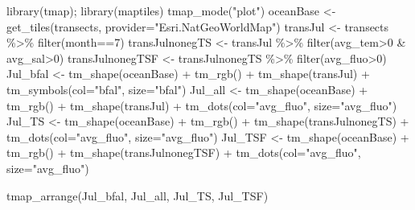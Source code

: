 \documentclass[
]{book}
\newenvironment{Shaded}{\begin{snugshade}}{\end{snugshade}}
\newcommand{\AttributeTok}[1]{\textcolor[rgb]{0.61,0.61,0.61}{#1}}
\newcommand{\DecValTok}[1]{\textcolor[rgb]{0.06,0.06,0.06}{#1}}
\newcommand{\FunctionTok}[1]{\textcolor[rgb]{0,0,0}{#1}}
\newcommand{\NormalTok}[1]{#1}
\newcommand{\OtherTok}[1]{\textcolor[rgb]{0.37,0.37,0.37}{#1}}
\newcommand{\SpecialCharTok}[1]{\textcolor[rgb]{0,0,0}{#1}}
\newcommand{\StringTok}[1]{\textcolor[rgb]{0.5,0.5,0.5}{#1}}
\begin{document}
\begin{Shaded}
\begin{Highlighting}[]
\FunctionTok{library}\NormalTok{(tmap); }\FunctionTok{library}\NormalTok{(maptiles)}
\FunctionTok{tmap\_mode}\NormalTok{(}\StringTok{"plot"}\NormalTok{)}
\NormalTok{oceanBase }\OtherTok{\textless{}{-}} \FunctionTok{get\_tiles}\NormalTok{(transects, }\AttributeTok{provider=}\StringTok{"Esri.NatGeoWorldMap"}\NormalTok{)}
\NormalTok{transJul }\OtherTok{\textless{}{-}}\NormalTok{ transects }\SpecialCharTok{\%\textgreater{}\%} \FunctionTok{filter}\NormalTok{(month}\SpecialCharTok{==}\DecValTok{7}\NormalTok{)}
\NormalTok{transJulnonegTS }\OtherTok{\textless{}{-}}\NormalTok{ transJul }\SpecialCharTok{\%\textgreater{}\%} \FunctionTok{filter}\NormalTok{(avg\_tem}\SpecialCharTok{\textgreater{}}\DecValTok{0} \SpecialCharTok{\&}\NormalTok{ avg\_sal}\SpecialCharTok{\textgreater{}}\DecValTok{0}\NormalTok{)}
\NormalTok{transJulnonegTSF }\OtherTok{\textless{}{-}}\NormalTok{ transJulnonegTS }\SpecialCharTok{\%\textgreater{}\%} \FunctionTok{filter}\NormalTok{(avg\_fluo}\SpecialCharTok{\textgreater{}}\DecValTok{0}\NormalTok{)}
\NormalTok{Jul\_bfal }\OtherTok{\textless{}{-}} \FunctionTok{tm\_shape}\NormalTok{(oceanBase) }\SpecialCharTok{+} \FunctionTok{tm\_rgb}\NormalTok{() }\SpecialCharTok{+}
  \FunctionTok{tm\_shape}\NormalTok{(transJul) }\SpecialCharTok{+} \FunctionTok{tm\_symbols}\NormalTok{(}\AttributeTok{col=}\StringTok{"bfal"}\NormalTok{, }\AttributeTok{size=}\StringTok{"bfal"}\NormalTok{)}
\NormalTok{Jul\_all }\OtherTok{\textless{}{-}} \FunctionTok{tm\_shape}\NormalTok{(oceanBase) }\SpecialCharTok{+} \FunctionTok{tm\_rgb}\NormalTok{() }\SpecialCharTok{+}
  \FunctionTok{tm\_shape}\NormalTok{(transJul) }\SpecialCharTok{+} \FunctionTok{tm\_dots}\NormalTok{(}\AttributeTok{col=}\StringTok{"avg\_fluo"}\NormalTok{, }\AttributeTok{size=}\StringTok{"avg\_fluo"}\NormalTok{)}
\NormalTok{Jul\_TS }\OtherTok{\textless{}{-}} \FunctionTok{tm\_shape}\NormalTok{(oceanBase) }\SpecialCharTok{+} \FunctionTok{tm\_rgb}\NormalTok{() }\SpecialCharTok{+}
  \FunctionTok{tm\_shape}\NormalTok{(transJulnonegTS) }\SpecialCharTok{+} \FunctionTok{tm\_dots}\NormalTok{(}\AttributeTok{col=}\StringTok{"avg\_fluo"}\NormalTok{, }\AttributeTok{size=}\StringTok{"avg\_fluo"}\NormalTok{)}
\NormalTok{Jul\_TSF }\OtherTok{\textless{}{-}} \FunctionTok{tm\_shape}\NormalTok{(oceanBase) }\SpecialCharTok{+} \FunctionTok{tm\_rgb}\NormalTok{() }\SpecialCharTok{+}
  \FunctionTok{tm\_shape}\NormalTok{(transJulnonegTSF) }\SpecialCharTok{+} \FunctionTok{tm\_dots}\NormalTok{(}\AttributeTok{col=}\StringTok{"avg\_fluo"}\NormalTok{, }\AttributeTok{size=}\StringTok{"avg\_fluo"}\NormalTok{)}

\FunctionTok{tmap\_arrange}\NormalTok{(Jul\_bfal, Jul\_all, Jul\_TS, Jul\_TSF)}
\end{Highlighting}
\end{Shaded}
\end{document}
